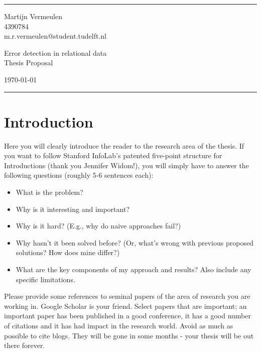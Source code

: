 \documentclass[a4paper]{article}
\begin{document}

\fancyhead[C]{}
\hrule \medskip %
\begin{minipage}{0.295\textwidth} 
\raggedright
\footnotesize
Martijn Vermeulen \hfill\\   
4390784 \hfill\\
m.r.vermeulen@student.tudelft.nl
\end{minipage}
\begin{minipage}{0.4\textwidth} 
\centering 
\large 
Error detection in relational data\\ 
\normalsize 
Thesis Proposal\\ 
\end{minipage}
\begin{minipage}{0.295\textwidth} 
\raggedleft
\today\hfill\\
\end{minipage}
\medskip\hrule 
\bigskip


\section{Introduction}
Here you will clearly introduce the reader to the research area of the thesis. If you want to follow Stanford InfoLab's patented five-point structure for Introductions (thank you Jennifer Widom!), you will simply have to answer the following questions (roughly 5-6 sentences each):
\begin{itemize}
    \item What is the problem? 
    \item Why is it interesting and important?
    \item Why is it hard? (E.g., why do naive approaches fail?)
    \item Why hasn't it been solved before? (Or, what's wrong with previous proposed solutions? How does mine differ?)
    \item What are the key components of my approach and results? Also include any specific limitations.
\end{itemize}

Please provide some references to seminal papers of the area of research you are working in. Google Scholar is your friend. Select papers that are important; an important paper has been published in a good conference, it has a good number of citations and it has had impact in the research world. Avoid as much as possible to cite blogs. They will be gone in some months - your thesis will be out there forever. 
\end{document}
